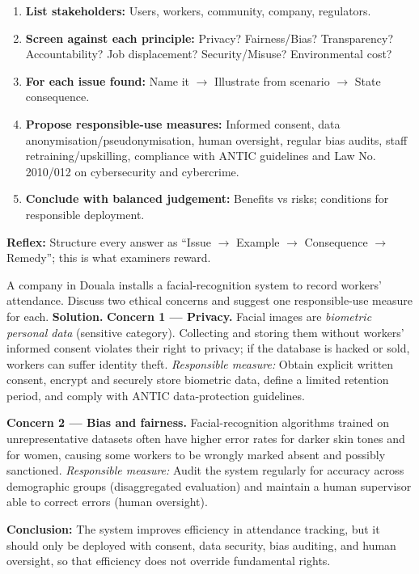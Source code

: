 \documentclass[11pt]{article}
\begin{document}
\begin{methode}
\begin{enumerate}
\item \textbf{List stakeholders:} Users, workers, community, company, regulators.
\item \textbf{Screen against each principle:} Privacy? Fairness/Bias? Transparency? Accountability? Job displacement? Security/Misuse? Environmental cost?
\item \textbf{For each issue found:} Name it $\rightarrow$ Illustrate from scenario $\rightarrow$ State consequence.
\item \textbf{Propose responsible-use measures:} Informed consent, data anonymisation/pseudonymisation, human oversight, regular bias audits, staff retraining/upskilling, compliance with ANTIC guidelines and Law No. 2010/012 on cybersecurity and cybercrime.
\item \textbf{Conclude with balanced judgement:} Benefits vs risks; conditions for responsible deployment.
\end{enumerate}
\textbf{Reflex:} Structure every answer as ``Issue $\rightarrow$ Example $\rightarrow$ Consequence $\rightarrow$ Remedy''; this is what examiners reward.
\end{methode}

\begin{exoresolu}
A company in Douala installs a facial-recognition system to record workers' attendance. Discuss two ethical concerns and suggest one responsible-use measure for each.
\tcblower
\textbf{Solution.}
\textbf{Concern 1 — Privacy.} Facial images are \emph{biometric personal data} (sensitive category). Collecting and storing them without workers' informed consent violates their right to privacy; if the database is hacked or sold, workers can suffer identity theft. \emph{Responsible measure:} Obtain explicit written consent, encrypt and securely store biometric data, define a limited retention period, and comply with ANTIC data-protection guidelines.

\textbf{Concern 2 — Bias and fairness.} Facial-recognition algorithms trained on unrepresentative datasets often have higher error rates for darker skin tones and for women, causing some workers to be wrongly marked absent and possibly sanctioned. \emph{Responsible measure:} Audit the system regularly for accuracy across demographic groups (disaggregated evaluation) and maintain a human supervisor able to correct errors (human oversight).

\textbf{Conclusion:} The system improves efficiency in attendance tracking, but it should only be deployed with consent, data security, bias auditing, and human oversight, so that efficiency does not override fundamental rights.
\end{exoresolu}
\end{document}
